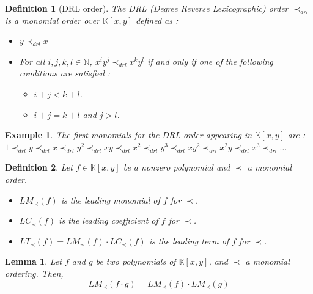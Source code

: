 \documentclass{article}
\newtheorem{lemma}{Lemma}[section]
\newtheorem{definition}{Definition}[section]
\newtheorem{example}{Example}[section]
\begin{document}
\begin{definition}[DRL order]
    The DRL (Degree Reverse Lexicographic) order $\prec_{drl}$ is a monomial order over $\mathbb{K}[x, y]$ defined as : 
    \begin{itemize}
        \item $y \prec_{drl} x$
        \item For all $i, j, k, l \in \mathbb{N}$, $x^{i}y^{j} \prec_{drl} x^{k}y^{l}$ if and only if one of the following conditions are satisfied : 
        \begin{itemize}
            \item $i + j < k + l$.
            \item $i + j = k + l$ and $j > l$.
        \end{itemize}
    \end{itemize}
\end{definition}

\begin{example}
    The first monomials for the DRL order appearing in $\mathbb{K}[x, y]$ are : \\
    $1 \prec_{drl} y \prec_{drl} x \prec_{drl} y^{2} \prec_{drl} xy \prec_{drl} x^{2} \prec_{drl} y^{3} \prec_{drl} xy^{2} \prec_{drl} x^{2} y \prec_{drl} x^{3} \prec_{drl} \dots$
\end{example}

\begin{definition} 
    Let $f \in \mathbb{K}[x, y]$ be a nonzero polynomial and $\prec$ a monomial order. 
    \begin{itemize}
        \item $LM_{\prec}(f)$ is the leading monomial of $f$ for $\prec$.
        \item $LC_{\prec}(f)$ is the leading coefficient of $f$ for $\prec$.
        \item $LT_{\prec}(f) = LM_{\prec}(f) \cdot LC_{\prec}(f)$ is the leading term of $f$ for $\prec$.
    \end{itemize}
\end{definition}

\begin{lemma} \label{lemma:lm-mult}
    Let $f$ and $g$ be two polynomials of $\mathbb{K}[x, y]$, and $\prec$ a monomial ordering. Then, 
    \begin{displaymath}
        LM_{\prec}(f \cdot g) = LM_{\prec}(f) \cdot LM_{\prec}(g)
    \end{displaymath}
\end{lemma}
\end{document}
